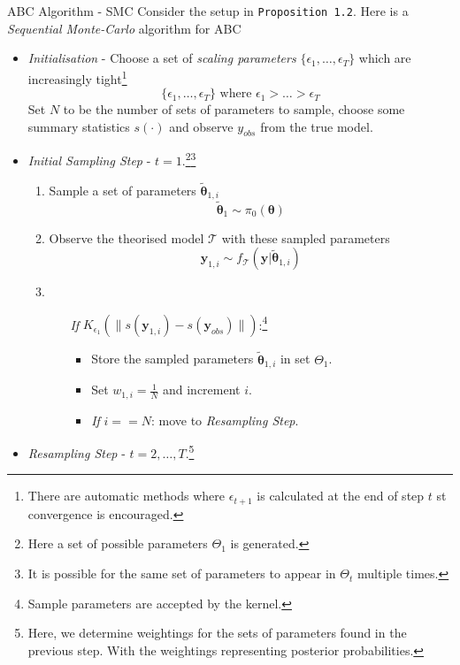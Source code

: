 \documentclass[11pt,a4paper]{article}
\begin{document}
  \begin{proposition}{ABC Algorithm - SMC\cite{Delayed_Acceptance_ABC_SMC}\cite{youtube_ABC_intro}\cite{doi:10.1098/rsif.2008.0172}}
    Consider the setup in \texttt{Proposition 1.2}. Here is a \textit{Sequential Monte-Carlo} algorithm for ABC
    \begin{itemize}
      \item \textit{Initialisation} - Choose a set of \textit{scaling parameters} $\{\epsilon_1,\dots,\epsilon_T\}$ which are increasingly tight\footnote{There are automatic methods where $\epsilon_{t+1}$ is calculated at the end of step $t$ st convergence is encouraged.}
      \[ \{\epsilon_1,\dots,\epsilon_T\}\text{ where }\epsilon_1>\dots>\epsilon_T\]
      Set $N$ to be the number of sets of parameters to sample, choose some summary statistics $s(\cdot)$ and observe $y_{obs}$ from the true model.
      \item \textit{Initial Sampling Step} - $t=1$.\footnote{Here a set of possible parameters $\Theta_1$ is generated.}\footnote{It is possible for the same set of parameters to appear in $\Theta_t$ multiple times.}
      \begin{enumerate}
        \item Sample a set of parameters $\tilde{\pmb\theta}_{1,i}$\[ \tilde{\pmb\theta}_1\sim\pi_0(\pmb\theta) \]
        \item Observe the theorised model $\mathcal{T}$ with these sampled parameters
        \[ \mathbf{y}_{1,i}\sim f_\mathcal{T}(\mathbf{y}|\tilde{\pmb\theta}_{1,i}) \]
        \item
        \begin{itemize}
          \item[\textit{If}] $K_{\epsilon_1}(\|s(\mathbf{y}_{1,i})-s(\mathbf{y}_{obs})\|)$:\footnote{Sample parameters are accepted by the kernel.}
          \begin{itemize}
            \item Store the sampled parameters $\tilde{\pmb\theta}_{1,i}$ in set $\Theta_1$.
            \item Set $w_{1,i}=\frac1N$ and increment $i$.
            \item \textit{If }$i==N$: move to \textit{Resampling Step}.
          \end{itemize}
        \end{itemize}
      \end{enumerate}
      \item \textit{Resampling Step} - $t=2,\dots,T$.\footnote{Here, we determine weightings for the sets of parameters found in the previous step. With the weightings representing posterior probabilities.}

\end{itemize}
\end{proposition}
\end{document}
